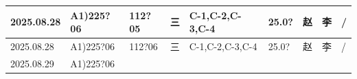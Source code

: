 \documentclass[UTF8,10pt,a4paper,fontset=fandol]{ctexart}
\newcommand{\fieldvalue}[1]{#1}
\newcommand{\handwritten}[1]{#1}
\begin{document}
\begin{tabular}{|p{1.55cm}|p{2.05cm}|p{1.35cm}|p{1.35cm}|p{1.55cm}|p{1.45cm}|p{1.25cm}|p{1.25cm}|p{1.20cm}|}
\fieldvalue{\handwritten{2025.08.28}} &
\fieldvalue{\handwritten{A1)225?06}} &
\fieldvalue{\handwritten{112?05}} &
\fieldvalue{\handwritten{三}} &
\fieldvalue{\handwritten{C-1,C-2,C-3,C-4}} &
\fieldvalue{\handwritten{25.0?}} &
\fieldvalue{\handwritten{赵}} &
\fieldvalue{\handwritten{李}} &
\fieldvalue{\handwritten{/}} \\
\hline
\fieldvalue{\handwritten{2025.08.28}} &
\fieldvalue{\handwritten{A1)225?06}} &
\fieldvalue{\handwritten{112?06}} &
\fieldvalue{\handwritten{三}} &
\fieldvalue{\handwritten{C-1,C-2,C-3,C-4}} &
\fieldvalue{\handwritten{25.0?}} &
\fieldvalue{\handwritten{赵}} &
\fieldvalue{\handwritten{李}} &
\fieldvalue{\handwritten{/}} \\
\hline
\fieldvalue{\handwritten{2025.08.29}} &
\fieldvalue{\handwritten{A1)225?06}} &

\end{tabular}
\end{document}
